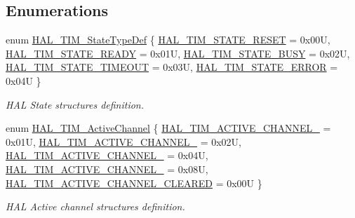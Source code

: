\subsection*{Enumerations}
\begin{DoxyCompactItemize}
\item 
enum \hyperlink{group___t_i_m___exported___types_gae0994cf5970e56ca4903e9151f40010c}{H\+A\+L\+\_\+\+T\+I\+M\+\_\+\+State\+Type\+Def} \{ \newline
\hyperlink{group___t_i_m___exported___types_ggae0994cf5970e56ca4903e9151f40010ca28011b79e60b74a6c55947c505c51cbc}{H\+A\+L\+\_\+\+T\+I\+M\+\_\+\+S\+T\+A\+T\+E\+\_\+\+R\+E\+S\+ET} = 0x00U, 
\hyperlink{group___t_i_m___exported___types_ggae0994cf5970e56ca4903e9151f40010ca4545554d7fa04d17e78d69d17cb7e4b3}{H\+A\+L\+\_\+\+T\+I\+M\+\_\+\+S\+T\+A\+T\+E\+\_\+\+R\+E\+A\+DY} = 0x01U, 
\hyperlink{group___t_i_m___exported___types_ggae0994cf5970e56ca4903e9151f40010ca1ddbfef19ad0562eb8143919b710cc12}{H\+A\+L\+\_\+\+T\+I\+M\+\_\+\+S\+T\+A\+T\+E\+\_\+\+B\+U\+SY} = 0x02U, 
\hyperlink{group___t_i_m___exported___types_ggae0994cf5970e56ca4903e9151f40010ca03e3339df71a74ac37820f72c2989371}{H\+A\+L\+\_\+\+T\+I\+M\+\_\+\+S\+T\+A\+T\+E\+\_\+\+T\+I\+M\+E\+O\+UT} = 0x03U, 
\newline
\hyperlink{group___t_i_m___exported___types_ggae0994cf5970e56ca4903e9151f40010ca318cceb243cb9ca9e01833913e4f90ea}{H\+A\+L\+\_\+\+T\+I\+M\+\_\+\+S\+T\+A\+T\+E\+\_\+\+E\+R\+R\+OR} = 0x04U
 \}\begin{DoxyCompactList}\small\item\em H\+AL State structures definition. \end{DoxyCompactList}
\item 
enum \hyperlink{group___t_i_m___exported___types_gaa3fa7bcbb4707f1151ccfc90a8cf9706}{H\+A\+L\+\_\+\+T\+I\+M\+\_\+\+Active\+Channel} \{ \newline
\hyperlink{group___t_i_m___exported___types_ggaa3fa7bcbb4707f1151ccfc90a8cf9706a2024e95c48b58ec9b2115faa276e3fad}{H\+A\+L\+\_\+\+T\+I\+M\+\_\+\+A\+C\+T\+I\+V\+E\+\_\+\+C\+H\+A\+N\+N\+E\+L\+\_} = 0x01U, 
\hyperlink{group___t_i_m___exported___types_ggaa3fa7bcbb4707f1151ccfc90a8cf9706ae80e6a1dd1c479f504219c0fec2f3322}{H\+A\+L\+\_\+\+T\+I\+M\+\_\+\+A\+C\+T\+I\+V\+E\+\_\+\+C\+H\+A\+N\+N\+E\+L\+\_} = 0x02U, 
\hyperlink{group___t_i_m___exported___types_ggaa3fa7bcbb4707f1151ccfc90a8cf9706acc3fcf4ee6d91744c4bc6a5eccde2601}{H\+A\+L\+\_\+\+T\+I\+M\+\_\+\+A\+C\+T\+I\+V\+E\+\_\+\+C\+H\+A\+N\+N\+E\+L\+\_} = 0x04U, 
\hyperlink{group___t_i_m___exported___types_ggaa3fa7bcbb4707f1151ccfc90a8cf9706a7d98ec7e385cacb3aaa6cec601fa6ab6}{H\+A\+L\+\_\+\+T\+I\+M\+\_\+\+A\+C\+T\+I\+V\+E\+\_\+\+C\+H\+A\+N\+N\+E\+L\+\_} = 0x08U, 
\newline
\hyperlink{group___t_i_m___exported___types_ggaa3fa7bcbb4707f1151ccfc90a8cf9706a574f72ac3bb41fe660318aa42dfdc98d}{H\+A\+L\+\_\+\+T\+I\+M\+\_\+\+A\+C\+T\+I\+V\+E\+\_\+\+C\+H\+A\+N\+N\+E\+L\+\_\+\+C\+L\+E\+A\+R\+ED} = 0x00U
 \}\begin{DoxyCompactList}\small\item\em H\+AL Active channel structures definition. \end{DoxyCompactList}
\end{DoxyCompactItemize}


